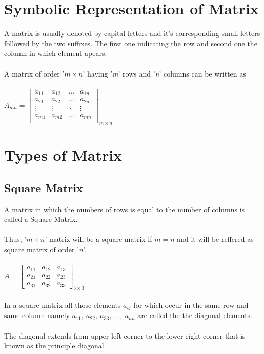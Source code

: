 \documentclass{article}
\begin{document}
	\section{Symbolic Representation of Matrix}
	A matrix is usually denoted by capital letters and it's corresponding small letters followed by the two suffixes. The first  one indicating the row and second one the column in which element apears. 
	\\ \\
	A matrix of order '$ m \times n  $' having '\textit{m}' rows and '\textit{n}' columns can be written as
	\\ \\
	$ A_{mn} = {
		\left[ \begin{array}{cccc}
			a_{11} & a_{12} & \dots & a_{1n} \\
			a_{21} & a_{22} & \dots & a_{2n} \\
			\vdots & \vdots & \ddots & \vdots \\
			a_{m1} & a_{m2} & \dots & a_{mn} \\
		\end{array} \right] }_{m \times n} $
	
	\section{Types of Matrix}
	\subsection{Square Matrix}
	A matrix in which the numbers of rows is equal to the number of columns is called a Square Matrix.
	\\ \\
	Thus, '$ m \times n $' matrix  will be a square matrix if $ m=n $ and it will be reffered as square matrix of order '\textit{n}'.
	\\ \\
	$ A =  { 
		\left[ \begin{array}{ccc}
			a_{11} & a_{12} & a_{13} \\ 
			a_{21} & a_{22} & a_{23} \\
			a_{31} & a_{32} & a_{33}
		\end{array} \right] }_{3 \times 3} $
	\\ \\
	In a square matrix all those elements $ a_{ij} $ for which occur in the same row and same column namely $ a_{11}, ~ a_{22}, ~ a_{33}, ~ \dots, ~ a_{nn} $ are called the the diagonal elements.
	\\ \\
	The diagonal extends from upper left corner to the lower right corner that is known as the principle diagonal.
	
\end{document}
